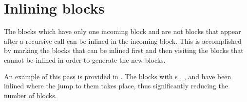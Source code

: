 \section{Inlining blocks}

The blocks which have only one incoming block and are not blocks that appear after a recursive call can be inlined in
the incoming block. This is accomplished by marking the blocks that can be inlined first and then visiting the blocks
that cannot be inlined in order to generate the new blocks.

An example of this pass is provided in . The blocks with s ,
,  and  have been inlined where the jump to them takes place, thus significantly reducing the
number of blocks.

\begin{figure}[htb]
\end{figure}
